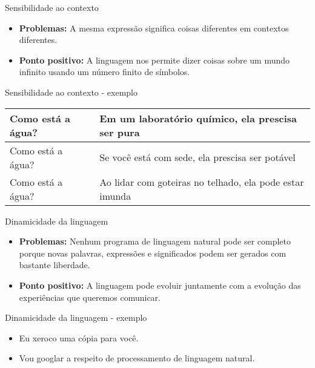 \begin{frame}{Sensibilidade ao contexto}
\begin{itemize}
\item \textbf{Problemas:} A mesma expressão significa coisas diferentes em contextos diferentes.
\item \textbf{Ponto positivo:} A linguagem nos permite dizer coisas sobre um mundo infinito usando um número finito de símbolos.
\end{itemize}
\end{frame}

\begin{frame}{Sensibilidade ao contexto - exemplo}
\begin{table}[!htp]
	\begin{tabular}{| p{3cm} | p{7.5cm} |}

		\hline Como está a água? & Em um laboratório químico, ela prescisa ser pura \\
		\hline Como está a água? & Se você está com sede, ela prescisa ser potável \\
		\hline Como está a água? & Ao lidar com goteiras no telhado, ela pode estar imunda \\
		\hline

	\end{tabular}
\end{table}
\end{frame}


\begin{frame}{Dinamicidade da linguagem}
\begin{itemize}
\item \textbf{Problemas:} Nenhum programa de linguagem natural pode ser completo porque novas palavras, expressões e significados podem ser gerados com bastante liberdade.
\item \textbf{Ponto positivo:} A linguagem pode evoluir juntamente com a evolução das experiências que queremos comunicar.
\end{itemize}
\end{frame}

\begin{frame}{Dinamicidade da linguagem - exemplo}
\begin{block}{}
\begin{itemize}
\item Eu xeroco uma cópia para você.
\item Vou googlar a respeito de processamento de linguagem natural.
\end{itemize}
\end{block}
\end{frame}



